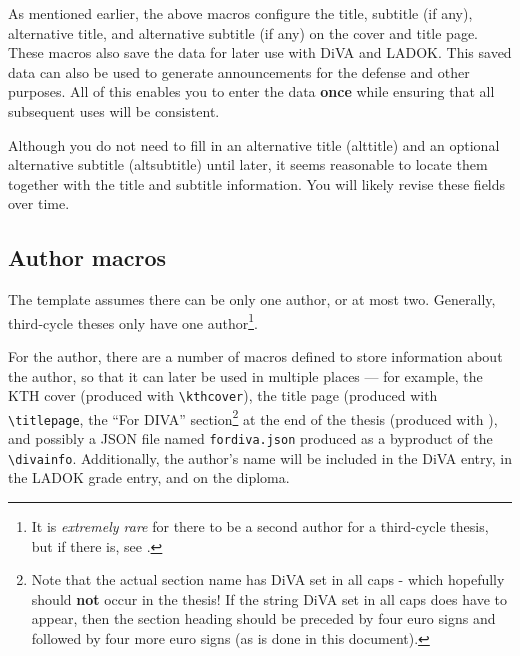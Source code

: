 \documentclass[12pt, twoside]{article}
\newcommand{\fname}[1]{\texttt{#1}}
\begin{document}
As mentioned earlier, the above macros configure the title, subtitle (if any), alternative title, and alternative subtitle (if any) on the cover and title page. 
These macros also save the data for later use with \gls{DiVA} and \gls{LADOK}. This saved data can also be used to generate announcements for the defense and other purposes. All of this enables you to enter the data \textbf{once} while ensuring that all subsequent uses will be consistent.

Although you do not need to fill in an alternative title (alttitle) and an optional alternative subtitle (altsubtitle) until later, it seems reasonable to locate them together with the title and subtitle information. You will likely revise these fields over time.


\subsection{Author macros}
\label{sec:cycle3authorMacros}
The template assumes there can be only one author, or at most two. Generally, third-cycle theses only have one author\footnote{It is \textit{extremely rare} for there to be a second author for a third-cycle thesis, but if there is, see .}.

For the author, there are a number of macros defined to store information about the author, so that it can later be used in multiple places --- for example, the \gls{KTH} cover (produced with \texttt{\textbackslash kthcover}), the title page (produced with \texttt{\textbackslash titlepage}, the \enquote{For DIVA} section\footnote{Note that the actual section name has \gls{DiVA} set in all caps - which hopefully should \textbf{not} occur in the thesis! If the string \gls{DiVA} set in all caps does have to appear, then the section heading should be preceded by four euro signs and followed by four more euro signs (as is done in this document).} at the end of the thesis (produced with ), \linebreak[4]and possibly a \gls{JSON} file named \fname{fordiva.json} produced as a byproduct of the \texttt{\textbackslash divainfo}. Additionally, the author's name will be included in the \gls{DiVA} entry, in the \gls{LADOK} grade entry, and on the diploma.
\end{document}
